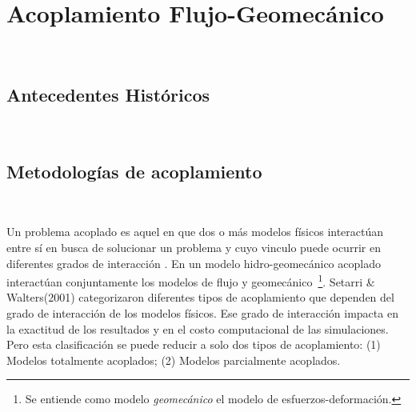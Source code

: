 %





\chapter{Acoplamiento Flujo-Geomecánico}~\hypertarget{ch:chapter_02}{}
\label{ch:chapter_02}

\lipsum[1-2]

\bigskip



\section{Antecedentes Históricos}~\hypertarget{sec:sec210}{}
\label{sec:sec210}




\section{Metodologías de acoplamiento}~\hypertarget{sec:sec220}{}
\label{sec:sec220}

Un problema acoplado es aquel en que dos o más modelos físicos interactúan entre sí en busca de solucionar un problema y cuyo vinculo puede ocurrir en diferentes grados de interacción  \cite{Tran2005}. En un modelo hidro-geomecánico acoplado interactúan conjuntamente los modelos de flujo y geomecánico~\footnote{Se entiende como modelo \textit{geomecánico} el modelo de esfuerzos-deformación.}. Setarri \& Walters(2001) \cite{Settari2001} categorizaron diferentes tipos de acoplamiento que dependen del grado de interacción de los modelos físicos. Ese grado de interacción impacta en la exactitud de los resultados y en el costo computacional de las simulaciones. Pero esta clasificación se puede reducir a solo dos tipos de acoplamiento: (1) Modelos totalmente acoplados; (2) Modelos parcialmente acoplados.\bigskip

